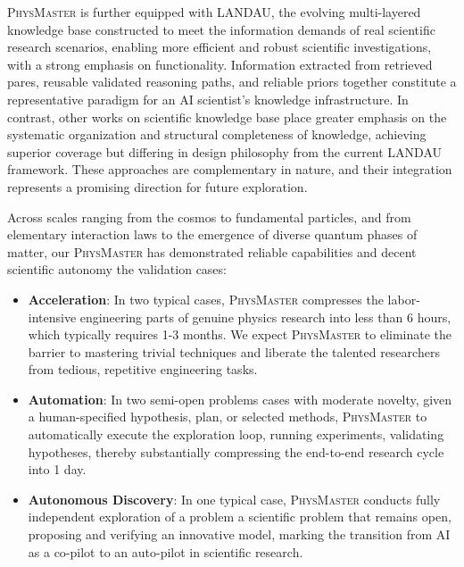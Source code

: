 \documentclass[11pt, a4paper, logo, copyright, nonumbering]{SAI}
\newcommand{\agent}{\textsc{PhysMaster}\xspace}
\newcommand{\knowledge}{\textsc{LANDAU}\xspace}
\begin{document}
\agent is further equipped with \knowledge, the evolving multi-layered knowledge base constructed to meet the information demands of real scientific research scenarios, enabling more efficient and robust scientific investigations, with a strong emphasis on functionality. Information extracted from retrieved pares, reusable validated reasoning paths, and reliable priors together constitute a representative paradigm for an AI scientist’s knowledge infrastructure. In contrast, other works on scientific knowledge base place greater emphasis on the systematic organization and structural completeness of knowledge, achieving superior coverage but differing in design philosophy from the current LANDAU framework. These approaches are complementary in nature, and their integration represents a promising direction for future exploration.

\newpage
Across scales ranging from the cosmos to fundamental particles, and from elementary interaction laws to the emergence of diverse quantum phases of matter, our \agent has demonstrated reliable capabilities and decent scientific autonomy the validation cases:

\vspace{-1.6ex}
\begin{itemize}
    \item \textbf{Acceleration}: In two typical cases, \agent compresses the labor-intensive engineering parts of genuine physics research into less than 6 hours, which typically requires 1-3 months. We expect \agent to eliminate the barrier to mastering trivial techniques and liberate the talented researchers from tedious, repetitive engineering tasks.
    \item \textbf{Automation}: In two semi-open problems cases with moderate novelty, given a human-specified hypothesis, plan, or selected methods, \agent to automatically execute the exploration loop, running experiments, validating hypotheses, thereby substantially compressing the end-to-end research cycle into 1 day.
    \item \textbf{Autonomous Discovery}: In one typical case, \agent conducts fully independent exploration of a problem a scientific problem that remains open, proposing and verifying an innovative model, marking the transition from AI as a co-pilot to an auto-pilot in scientific research.
\end{itemize}
\vspace{-1.6ex}

\vspace{-2.4ex}
\end{document}
